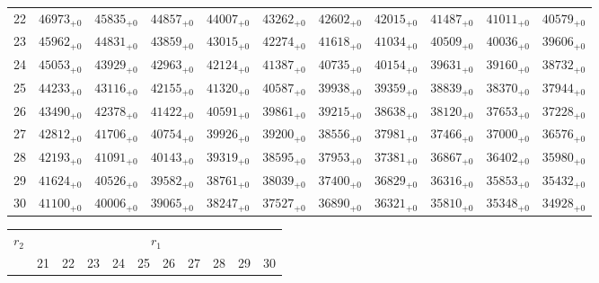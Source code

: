 \documentclass[10pt, a4paper]{article}
\begin{document}
\begin{center}
\begin{tabular}{c || c c c c c | c c c c c}
        22 & \({46973}_{+0}\) & \({45835}_{+0}\) & \({44857}_{+0}\) & \({44007}_{+0}\) & \({43262}_{+0}\) & \({42602}_{+0}\) & \({42015}_{+0}\) & \({41487}_{+0}\) & \({41011}_{+0}\) & \({40579}_{+0}\)\\
        23 & \({45962}_{+0}\) & \({44831}_{+0}\) & \({43859}_{+0}\) & \({43015}_{+0}\) & \({42274}_{+0}\) & \({41618}_{+0}\) & \({41034}_{+0}\) & \({40509}_{+0}\) & \({40036}_{+0}\) & \({39606}_{+0}\)\\
        24 & \({45053}_{+0}\) & \({43929}_{+0}\) & \({42963}_{+0}\) & \({42124}_{+0}\) & \({41387}_{+0}\) & \({40735}_{+0}\) & \({40154}_{+0}\) & \({39631}_{+0}\) & \({39160}_{+0}\) & \({38732}_{+0}\)\\
        25 & \({44233}_{+0}\) & \({43116}_{+0}\) & \({42155}_{+0}\) & \({41320}_{+0}\) & \({40587}_{+0}\) & \({39938}_{+0}\) & \({39359}_{+0}\) & \({38839}_{+0}\) & \({38370}_{+0}\) & \({37944}_{+0}\)\\
        \hline
        26 & \({43490}_{+0}\) & \({42378}_{+0}\) & \({41422}_{+0}\) & \({40591}_{+0}\) & \({39861}_{+0}\) & \({39215}_{+0}\) & \({38638}_{+0}\) & \({38120}_{+0}\) & \({37653}_{+0}\) & \({37228}_{+0}\)\\
        27 & \({42812}_{+0}\) & \({41706}_{+0}\) & \({40754}_{+0}\) & \({39926}_{+0}\) & \({39200}_{+0}\) & \({38556}_{+0}\) & \({37981}_{+0}\) & \({37466}_{+0}\) & \({37000}_{+0}\) & \({36576}_{+0}\)\\
        28 & \({42193}_{+0}\) & \({41091}_{+0}\) & \({40143}_{+0}\) & \({39319}_{+0}\) & \({38595}_{+0}\) & \({37953}_{+0}\) & \({37381}_{+0}\) & \({36867}_{+0}\) & \({36402}_{+0}\) & \({35980}_{+0}\)\\
        29 & \({41624}_{+0}\) & \({40526}_{+0}\) & \({39582}_{+0}\) & \({38761}_{+0}\) & \({38039}_{+0}\) & \({37400}_{+0}\) & \({36829}_{+0}\) & \({36316}_{+0}\) & \({35853}_{+0}\) & \({35432}_{+0}\)\\
        30 & \({41100}_{+0}\) & \({40006}_{+0}\) & \({39065}_{+0}\) & \({38247}_{+0}\) & \({37527}_{+0}\) & \({36890}_{+0}\) & \({36321}_{+0}\) & \({35810}_{+0}\) & \({35348}_{+0}\) & \({34928}_{+0}\)\\
        \hline
    \end{tabular}
    \pagebreak
    \begin{tabular}{c || c c c c c | c c c c c}
        \multirow{2}{*}{\(r_2\)} & \multicolumn{10}{c}{\(r_1\)} \\
        & 21 & 22 & 23 & 24 & 25 & 26 & 27 & 28 & 29 & 30\\
        \hline\hline

\end{tabular}
\end{center}
\end{document}
